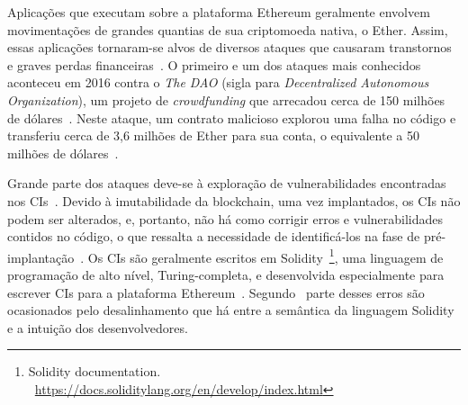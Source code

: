 
Aplicações que executam sobre a plataforma Ethereum geralmente envolvem movimentações de grandes quantias de sua criptomoeda nativa, o Ether. Assim, essas aplicações tornaram-se alvos de diversos ataques que causaram transtornos e graves perdas financeiras~\cite{atzei2017survey-attacks-sok, chen2020survey-ethereum-acm}. O primeiro e um dos ataques mais conhecidos aconteceu em 2016 contra o \textit{The DAO} (sigla para \textit{Decentralized
Autonomous Organization}), um projeto de \textit{crowdfunding} que arrecadou cerca de 150 milhões de dólares~\cite{chen2020survey-ethereum-acm}. Neste ataque, um contrato malicioso explorou uma falha no código e transferiu cerca de 3,6 milhões de Ether para sua conta, o equivalente a 50 milhões de dólares~\cite{chen2020survey-ethereum-acm, siegel-dao-attack, atzei2017survey-attacks-sok}. 

Grande parte dos ataques deve-se à exploração de vulnerabilidades encontradas nos CIs~\cite{chen2020survey-ethereum-acm, atzei2017survey-attacks-sok, liu2019survey-ieeeaccess}. Devido à imutabilidade da blockchain, uma vez implantados, os CIs não podem ser alterados, e, portanto, não há como corrigir erros e vulnerabilidades contidos no código, o que ressalta a necessidade de identificá-los na fase de pré-implantação~\cite{vacca2020systematic, dika2018security}. Os CIs são geralmente escritos em Solidity~\footnote{Solidity documentation. ~\url{https://docs.soliditylang.org/en/develop/index.html}}, uma linguagem de programação de alto nível, Turing-completa, e desenvolvida especialmente para escrever CIs para a plataforma Ethereum~\cite{varela2021smart-languages-acmcs}.    Segundo~ parte desses erros são ocasionados pelo desalinhamento que há entre a semântica da linguagem Solidity e a intuição dos desenvolvedores.

